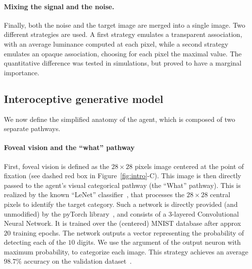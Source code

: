 \paragraph{Mixing the signal and the noise.} Finally, both the noise and the target image are merged into a single image. Two different strategies are used. A first strategy emulates a transparent association, with an average luminance computed at each pixel, while a second strategy emulates an opaque association, choosing for each pixel the maximal value. The quantitative difference was tested in simulations, but proved to have a marginal importance.
%
\subsection{Interoceptive generative model}
%
We now define the simplified anatomy of the agent, which is composed of two separate pathways.

\paragraph{Foveal vision and the ``what'' pathway}
First, foveal vision is defined as the $28\times 28$ pixels image centered at the point of fixation (see dashed red box in Figure~\ref{fig:intro}-C). This image is then directly passed to the agent's visual categorical pathway (the ``What'' pathway). This is realized by the known ``LeNet'' classifier~\citep{Lecun1998}, that processes the $28 \times 28$ central pixels to identify the target category. Such a network is directly provided (and unmodified) by the pyTorch library~\citep{Paszke17}, and consists of a 3-layered Convolutional Neural Network. It is trained over the (centered) MNIST database after approx $20$ training epochs. %
The network outputs a vector representing the probability of detecting each of the $10$ digits. We use the argument of the output neuron with maximum probability, to categorize each image. This strategy achieves an average $98.7\%$ accuracy on the validation dataset~\citep{Lecun1998}.%

